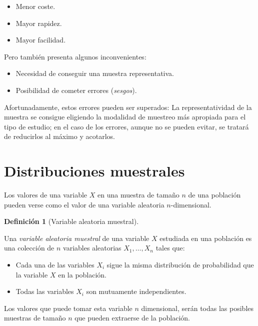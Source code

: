 \documentclass[
  a4paper,
]{scrreport}
\providecommand{\tightlist}{%
  \setlength{\itemsep}{0pt}\setlength{\parskip}{0pt}}\usepackage{longtable,booktabs,array}
\theoremstyle{plain}
\theoremstyle{definition}
\theoremstyle{definition}
\newtheorem{definition}{Definición}[chapter]
\theoremstyle{remark}
\begin{document}
\begin{itemize}
\tightlist
\item
  Menor coste.
\item
  Mayor rapidez.
\item
  Mayor facilidad.
\end{itemize}

Pero también presenta algunos inconvenientes:

\begin{itemize}
\tightlist
\item
  Necesidad de conseguir una muestra representativa.
\item
  Posibilidad de cometer errores (\emph{sesgos}).
\end{itemize}

Afortunadamente, estos errores pueden ser superados: La
representatividad de la muestra se consigue eligiendo la modalidad de
muestreo más apropiada para el tipo de estudio; en el caso de los
errores, aunque no se pueden evitar, se tratará de reducirlos al máximo
y acotarlos.

\section{Distribuciones muestrales}\label{distribuciones-muestrales}

Los valores de una variable \(X\) en una muestra de tamaño \(n\) de una
población pueden verse como el valor de una variable aleatoria
\(n\)-dimensional.

\begin{definition}[Variable aleatoria
muestral]\protect\hypertarget{def-variable-aleatoria-muestral}{}\label{def-variable-aleatoria-muestral}

Una \emph{variable aleatoria muestral} de una variable \(X\) estudiada
en una población es una colección de \(n\) variables aleatorias
\(X_1,\ldots,X_n\) tales que:

\begin{itemize}
\tightlist
\item
  Cada una de las variables \(X_i\) sigue la misma distribución de
  probabilidad que la variable \(X\) en la población.
\item
  Todas las variables \(X_i\) son mutuamente independientes.
\end{itemize}

\end{definition}

Los valores que puede tomar esta variable \(n\) dimensional, serán todas
las posibles muestras de tamaño \(n\) que pueden extraerse de la
población.
\end{document}
